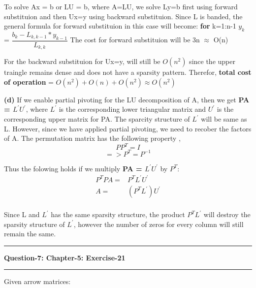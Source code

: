 \documentclass{article}
\newcommand\question[2]{\vspace{.25in}\hrule\textbf{#1: #2}\hrule\vspace{.10in}}
\renewcommand\part[1]{\vspace{.10in}\textbf{(#1)}}
\begin{document}
To solve Ax = b or LU = b, where A=LU, we solve Ly=b first using forward substituion and then Ux=y using backward substituion. Since L is banded, the general formula for forward substituion in this case will become: \newline
\textbf {for} k=1:n-1 \newline
\hspace*{0.5cm} $y_{k}$ = $\dfrac{b_{k} - L_{k,k-1}*y_{k-1}}{L_{k,k}}$ \newline
The cost for forward substituion will be 3n $\approx$ O(n)

For the backward substituion for Ux=y, will still be $O(n^2)$ since the upper traingle remains dense and does not have a sparsity pattern. \newline
Therefor, \textbf {total cost of operation} = $O(n^2) + O(n) + O(n^2) \approx O(n^2)$ \newline


\part{d}
If we enable partial pivoting for the LU decomposition of A, then we get \textbf {PA = $L^\prime U^\prime$}, where $L^\prime$ is the corresponding lower triangular matrix and $U^\prime$ is the corresponding upper matrix for PA. The sparcity structure of $L^\prime$ will be same as L. However, since we have applied partial pivoting, we need to recober the factors of A. The permutation matrix has the following property ,\newline
\[PP^T = I\]
\[=> P^T = P^{-1}\]

Thus the folowing holds if we multiply \textbf {PA = $L^\prime U^\prime$} by $P^T$: \newline
\begin{align*}
P^TPA =& P^TL^\prime U^\prime \\
A =& (P^TL^\prime )U^\prime \\
\end{align*}

Since L and $L^\prime$ has the same sparsity structure, the product $P^TL^\prime$ will destroy the sparsity structure of $L^\prime$, however the number of zeros for every column will still remain the same. \newline



\question{Question-7}{Chapter-5: Exercise-21}
Given arrow matrices: \newline
\end{document}
